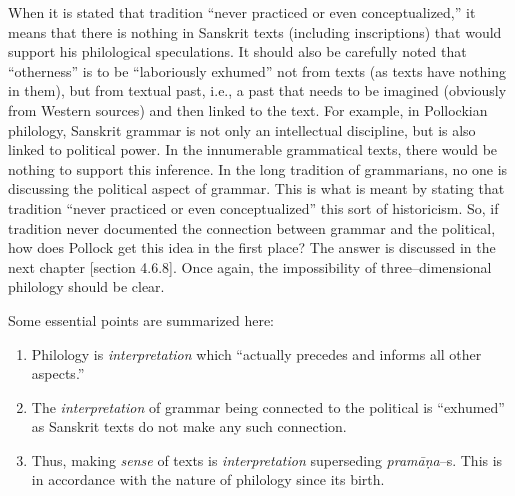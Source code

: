 When it is stated that tradition “never practiced or even conceptualized,” it means that there is nothing in Sanskrit texts (including inscriptions) that would support his philological speculations. It should also be carefully noted that “otherness” is to be “laboriously exhu\-med” not from texts (as texts have nothing in them), but from textual past, i.e., a past that needs to be imagined (obviously from Western sources) and then linked to the text. For example, in Pollockian philology, Sanskrit grammar is not only an intellectual discipline, but is also linked to political power. In the innumerable grammatical texts, there would be nothing to support this inference. In the long tradition of grammarians, no one is discussing the political aspect of grammar. This is what is meant by stating that tradition “never practiced or even conceptualized” this sort of historicism. So, if tradition never documented the connection between grammar and the political, how does Pollock get this idea in the first place? The answer is discussed in the next chapter [section 4.6.8]. Once again, the impossibility of three–dimensional philology should be clear.

Some essential points are summarized here:

\vspace{-.3cm}

\begin{enumerate}
\itemsep=0pt
\item Philology is \textit{interpretation} which “actually precedes and informs all other aspects.”

 \item The \textit{interpretation} of grammar being connected to the political is “exhumed” as Sanskrit texts do not make any such connection.

 \item Thus, making \textit{sense} of texts is \textit{interpretation} superseding \textit{pramāṇa}–s. This is in accordance with the nature of philology since its birth.

\end{enumerate}

